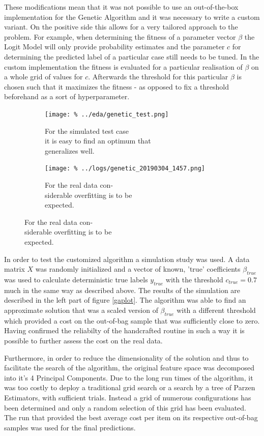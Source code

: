 These modifications mean that it was not possible to use an out-of-the-box implementation for the Genetic Algorithm and it was necessary to write a custom variant. On the positive side this allows for a very tailored approach to the problem. For example, when determining the fitness of a parameter vector $\beta$ the Logit Model will only provide probability estimates and the parameter $c$ for determining the predicted label of a particular case still needs to be tuned. In the custom implementation the fitness is evaluated for a particular realisation of $\beta$ on a whole grid of values for $c$. Afterwards the threshold for this particular $\beta$ is chosen such that it maximizes the fitness - as opposed to fix a threshold beforehand as a sort of hyperparameter.

\begin{figure}
\centering
\caption{Results of the Genetic Algorithm}\label{gaplot}
\begin{subfigure}[b]{0.5\textwidth}            
            \texttt{[image: \%
            ../eda/genetic\_test.png]}
            \caption{For the simulated test case \\ %
                     it is easy to find an optimum that \\%
                     generalizes well.}
    \end{subfigure}%
    \begin{subfigure}[b]{0.5\textwidth}
            \centering
            \texttt{[image: \%
            ../logs/genetic\_20190304\_1457.png]}
            \caption{For the real data con-\\%
                     siderable overfitting is to be \\%
                     expected.}
    \end{subfigure}
\end{figure}


In order to test the customized algorithm a simulation study was used. A data matrix $X$ was randomly initialized and a vector of known, 'true' coefficients $\beta_{true}$ was used to calculate deterministic true labels $y_{true}$ with the threshold $c_{true} = 0.7$ much in the same way as described above. The results of the simulation are described in the left part of figure \ref{gaplot}. The algorithm was able to find an approximate solution that was a scaled version of $\beta_{true}$ with a different threshold which provided a cost on the out-of-bag sample that was sufficiently close to zero. Having confirmed the reliabilty of the handcrafted routine in such a way it is possible to further assess the cost on the real data.

Furthermore, in order to reduce the dimensionality of the solution and thus to facilitate the search of the algorithm, the original feature space was decomposed into it's 4 Principal Components. Due to the long run times of the algorithm, it was too costly to deploy a traditional grid search or a search by a tree of Parzen Estimators, with sufficient trials. Instead a grid of numerous configurations has been determined and only a random selection of this grid has been evaluated. The run that provided the best average cost per item on its respective out-of-bag samples was used for the final predictions.


